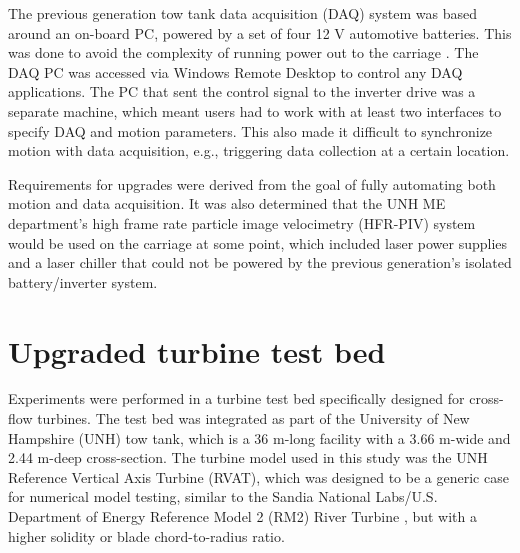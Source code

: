 The previous generation tow tank data acquisition (DAQ) system was based around
an on-board PC, powered by a set of four 12 V automotive batteries. This was
done to avoid the complexity of running power out to the carriage
\cite{Darnell1996}. The DAQ PC was accessed via Windows Remote Desktop to
control any DAQ applications. The PC that sent the control signal to the
inverter drive was a separate machine, which meant users had to work with at
least two interfaces to specify DAQ and motion parameters. This also made it
difficult to synchronize motion with data acquisition, e.g., triggering data
collection at a certain location.

Requirements for upgrades were derived from the goal of fully automating both
motion and data acquisition. It was also determined that the UNH ME department's
high frame rate particle image velocimetry (HFR-PIV) system would be used on the
carriage at some point, which included laser power supplies and a laser chiller
that could not be powered by the previous generation's isolated battery/inverter
system.



\section{Upgraded turbine test bed}



Experiments were performed in a turbine test bed specifically designed for
cross-flow turbines. The test bed was integrated as part of the University of
New Hampshire (UNH) tow tank, which is a 36 m-long facility with a 3.66 m-wide
and 2.44 m-deep cross-section. The turbine model used in this study was the UNH
Reference Vertical Axis Turbine (RVAT), which was designed to be a generic case
for numerical model testing, similar to the Sandia National Labs/U.S. Department
of Energy Reference Model 2 (RM2) River Turbine \cite{Neary2014}, but with a
higher solidity or blade chord-to-radius ratio.

